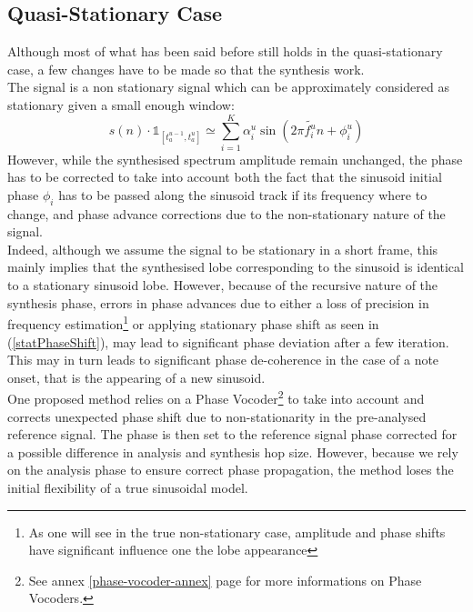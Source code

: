 \documentclass[]{article}
\begin{document}
\subsection{Quasi-Stationary Case}\label{quasi-stationary-case}
\hspace{15pt}Although most of what has been said before still holds in the quasi-stationary case, a few changes have to be made so that the synthesis work.\\
The signal is a non stationary signal which can be approximately considered as stationary given a small enough window:
\begin{equation}
s(n)\cdot \mathds{1}_{[t_a^{u-1}, t_a^u]} \simeq \sum_{i=1}^{K}\alpha_i^{u} \sin(2\pi \tilde{f_i^{u}} n + \phi_{i}^u)
\end{equation}
\hspace{15pt}However, while the synthesised spectrum amplitude remain unchanged, the phase has to be corrected to take into account both the fact that the sinusoid initial phase $\phi_i$ has to be passed along the sinusoid track if its frequency where to change, and phase advance corrections due to the non-stationary nature of the signal. \\
Indeed, although we assume the signal to be stationary in a short frame, this mainly implies that the synthesised lobe corresponding to the sinusoid is identical to a stationary sinusoid lobe. However, because of the recursive nature of the synthesis phase, errors in phase advances due to either a loss of precision in frequency estimation\footnote{As one will see in the true non-stationary case, amplitude and phase shifts have significant influence one the lobe appearance} or applying stationary phase shift as seen in (\ref{statPhaseShift}), may lead to significant phase deviation after a few iteration. This may in turn leads to significant phase de-coherence in the case of a note onset, that is the appearing of a new sinusoid.\\
One proposed method relies on a Phase Vocoder\footnote{See annex \ref{phase-vocoder-annex} page \pageref{phase-vocoder-annex} for more informations on Phase Vocoders.} to take into account and corrects unexpected phase shift due to non-stationarity in the pre-analysed reference signal. The phase is then set to the reference signal phase corrected for a possible difference in analysis and synthesis hop size. However, because we rely on the analysis phase to ensure correct phase propagation, the method loses the initial flexibility of a true sinusoidal model.\\
\end{document}
